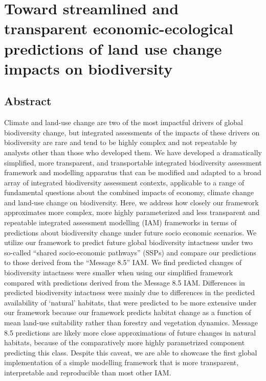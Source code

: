 \chapter{Toward streamlined and transparent economic-ecological predictions of land use change impacts on biodiversity}\label{ch4}
\newpage

\section{Abstract}

Climate and land-use change are two of the most impactful drivers of global biodiversity change, but integrated assessments of the impacts of these drivers on biodiversity are rare and tend to be highly complex and not repeatable by analysts other than those who developed them. We have developed a dramatically simplified, more transparent, and transportable integrated biodiversity assessment framework and modelling apparatus that can be modified and adapted to a broad array of integrated biodiversity assessment contexts, applicable to a range of fundamental questions about the combined impacts of economy, climate change and land-use change on biodiversity. Here, we address how closely our framework approximates more complex, more highly parameterized and less transparent and repeatable integrated assessment modelling (IAM) frameworks in terms of predictions about biodiversity change under future socio economic scenarios. We utilize our framework to predict future global biodiversity intactness under two so-called “shared socio-economic pathways” (SSPs) and compare our predictions to those derived from the “Message 8.5” IAM. We find predicted changes of biodiversity intactness were smaller when using our simplified framework compared with predictions derived from the Message 8.5 IAM.  Differences in predicted biodiversity intactness were mainly due to differences in the predicted availability of ‘natural’ habitats, that were predicted to be more extensive under our framework because our framework predicts habitat change as a function of mean land-use suitability rather than forestry and vegetation dynamics. Message 8.5 predictions are likely more close approximations of future changes in natural habitats, because of the comparatively more highly parametrized component predicting this class. Despite this caveat, we are able to showcase the first global implementation of a simple modelling framework that is more transparent, interpretable and reproducible than most other IAM.

